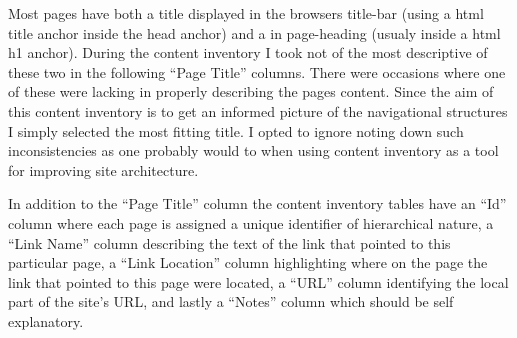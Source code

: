 \documentclass[12pt,a4paper]{article}
\begin{document}
Most pages have both a title displayed in the browsers title-bar (using a
html title anchor inside the head anchor) and a in page-heading (usualy inside
a html h1 anchor). During the content inventory I took not of the most
descriptive of these two in the following ``Page Title'' columns. There were
occasions where one of these were lacking in properly describing the pages
content. Since the aim of this content inventory is to get an informed picture
of the navigational structures I simply selected the most fitting title.
I opted to ignore noting down such inconsistencies as one probably would to
when using content inventory as a tool for improving site architecture.

In addition to the ``Page Title'' column the content inventory tables have an
``Id'' column where each page is assigned a unique identifier of hierarchical
nature, a ``Link Name'' column describing the text of the link that pointed to
this particular page, a ``Link Location'' column highlighting where on the
page the link that pointed to this page were located, a ``URL'' column
identifying the local part of the site's URL, and lastly a ``Notes'' column
which should be self explanatory.
\end{document}
